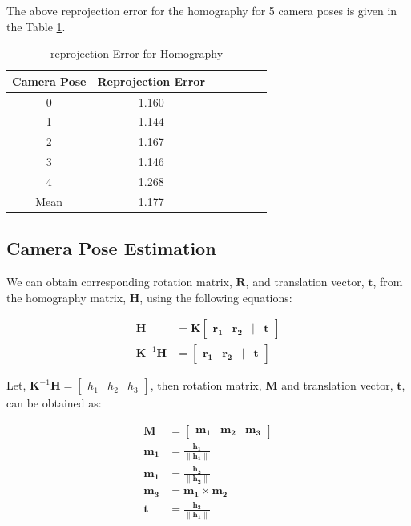 \documentclass{article}
\begin{document}
The above reprojection error for the homography for 5 camera poses is given in the Table \ref{tab:reprojection_error_homography}.

\begin{table}[h]
    \centering
    \begin{tabular}{|c|c|c|c|c|c|c|}
        \hline
        Camera Pose & Reprojection Error \\
        \hline
        0 & 1.160 \\
        1 & 1.144 \\
        2 & 1.167 \\
        3 & 1.146 \\
        4 & 1.268 \\
        Mean & 1.177 \\
        \hline
    \end{tabular}
    \caption{reprojection Error for Homography}
    \label{tab:reprojection_error_homography}
\end{table}

\subsection{Camera Pose Estimation}
We can obtain corresponding rotation matrix, $\mathbf{R}$, and translation vector, $\mathbf{t}$, from the homography matrix, $\mathbf{H}$, using the following equations:

\begin{align}
    \mathbf{H} &= \mathbf{K} \begin{bmatrix} \mathbf{r_1} & \mathbf{r_2} & | & \mathbf{t} \end{bmatrix} \\
    \mathbf{K}^{-1} \mathbf{H} &= \begin{bmatrix} \mathbf{r_1} & \mathbf{r_2} & | & \mathbf{t} \end{bmatrix}
\end{align}
    
Let, $\mathbf{K}^{-1} \mathbf{H} = \begin{bmatrix} h_1 & h_2 & h_3\end{bmatrix}$, then rotation matrix, $\mathbf{M}$ and translation vector, $\mathbf{t}$, can be obtained as:


\begin{align}
    \mathbf{M} &= \begin{bmatrix} \mathbf{m_1} & \mathbf{m_2} & \mathbf{m_3} \end{bmatrix} \\
    \mathbf{m_1} &= \frac{\mathbf{h_1}}{\|\mathbf{h_1}\|}  \\
    \mathbf{m_1} &= \frac{\mathbf{h_2}}{\|\mathbf{h_2}\|} \\
    \mathbf{m_3} &= \mathbf{m_1} \times \mathbf{m_2} \\
    \mathbf{t} &= \frac{\mathbf{h_3}}{\|\mathbf{h_1}\|}
\end{align}
\end{document}
